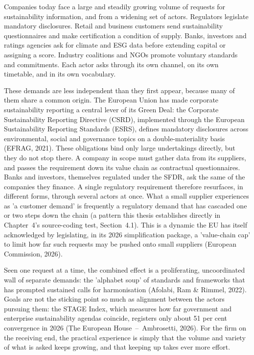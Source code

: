 Companies today face a large and steadily growing volume of requests for
sustainability information, and from a widening set of actors. Regulators
legislate mandatory disclosures. Retail and business customers send
sustainability questionnaires and make certification a condition of supply.
Banks, investors and ratings agencies ask for climate and ESG data before
extending capital or assigning a score. Industry coalitions and NGOs promote
voluntary standards and commitments. Each actor asks through its own channel, on
its own timetable, and in its own vocabulary.

These demands are less independent than they first appear, because many of them
share a common origin. The European Union has made corporate sustainability
reporting a central lever of its Green Deal: the Corporate Sustainability
Reporting Directive (CSRD), implemented through the European Sustainability
Reporting Standards (ESRS), defines mandatory disclosures across environmental,
social and governance topics on a double-materiality basis (EFRAG, 2021). These
obligations bind only large undertakings directly, but they do not stop there. A
company in scope must gather data from its suppliers, and passes the requirement
down its value chain as contractual questionnaires. Banks and investors,
themselves regulated under the SFDR, ask the same of the companies they finance.
A single regulatory requirement therefore resurfaces, in different forms,
through several actors at once. What a small supplier experiences as 'a
customer demand' is frequently a regulatory demand that has cascaded one or two
steps down the chain (a pattern this thesis establishes directly in Chapter~4's
source-coding test, Section~4.1).
This is a dynamic the EU has itself acknowledged by
legislating, in its 2026 simplification package, a 'value-chain cap' to limit
how far such requests may be pushed onto small suppliers (European Commission,
2026).

Seen one request at a time, the combined effect is a proliferating,
uncoordinated wall of separate demands: the 'alphabet soup' of standards and
frameworks that has prompted sustained calls for harmonisation (Afolabi, Ram \&
Rimmel, 2022).
Goals are not the sticking point so much as alignment between the actors pursuing
them: the STAGE Index, which measures how far government and enterprise
sustainability agendas coincide, registers only about 51 per cent convergence in
2026 (The European House~--~Ambrosetti, 2026). For the firm on the receiving end,
the practical experience is simply that the volume and variety of what is asked
keeps growing, and that keeping up takes ever more effort.

